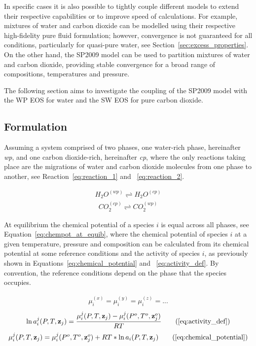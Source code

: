 
In specific cases it is also possible to tightly couple different models to extend their respective capabilities or to improve speed of calculations. For example, mixtures of water and carbon dioxide can be modelled using their respective high-fidelity pure fluid formulation; however, convergence is not guaranteed for all conditions, particularly for quasi-pure water, see Section~\ref{sec:excess_properties}. On the other hand, the \acf{SP2009} model can be used to partition mixtures of water and carbon dioxide, providing stable convergence for a broad range of compositions, temperatures and pressure.

The following section aims to investigate the coupling of the \acf{SP2009} model with the \acf{WP} \ac{EOS} for water and the \acf{SW} \ac{EOS} for pure carbon dioxide.

\subsection{Formulation}
\label{sec_semiempirical_formulation}
    Assuming a system comprised of two phases, one water-rich phase, hereinafter \emph{wp}, and one carbon dioxide-rich, hereinafter \emph{cp}, where the only reactions taking place are the migrations of water and carbon dioxide molecules from one phase to another, see Reaction~\ref{eq:reaction_1} and ~\ref{eq:reaction_2}.

    \begin{align}
        H_2O^{(wp)} \rightleftharpoons H_2O^{(cp)} \label{eq:reaction_1}
    \end{align}
    \begin{align}
        CO_2^{(cp)} \rightleftharpoons CO_2^{(wp)} \label{eq:reaction_2}
    \end{align}

    At equilibrium the chemical potential of a species \(i\) is equal across all phases, see Equation~\ref{eq:chempot_at_equib}, where the chemical potential of species \(i\) at a given temperature, pressure and composition can be calculated from its chemical potential at some reference conditions and the activity of species \(i\), as previously shown in Equations~\ref{eq:chemical_potential} and ~\ref{eq:activity_def}. By convention, the reference conditions depend on the phase that the species occupies. 

    \begin{align}
        \mu_i^{(x)}= \mu_i^{(y)}= \mu_i^{(z)}= ... \label{eq:chempot_at_equib}
    \end{align}
    \begin{align}
        \ln a_i^{j}(P, T, \mathbf{z}_j)= \frac{\mu_i^{j} (P, T, \mathbf{z}_j) - \mu_i^{j} (P^o, T^o, \mathbf{z}_j^o)}{RT} \tag{\ref{eq:activity_def}}
    \end{align}
    \begin{align}
        \mu_i^{j} (P, T, \mathbf{z}_j) = \mu_i^{j} (P^o, T^o, \mathbf{z}_j^o) +RT*\ln a_i (P, T, \mathbf{z}_j) \tag{\ref{eq:chemical_potential}}
    \end{align}

